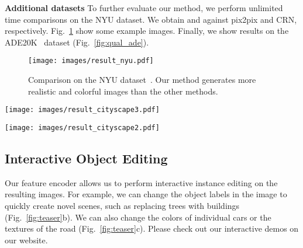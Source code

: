 \documentclass[10pt,twocolumn,letterpaper]{article}
\newcommand{\reffig}[1]{Fig.~\ref{fig:#1}}
\newcommand{\lblfig}[1]{\label{fig:#1}}
\newcommand{\lblsec}[1]{\label{sec:#1}}
\newcommand{\pp}{pix2pix\xspace}
\begin{document}
{\noindent \bf Additional datasets } To further evaluate our method, we perform unlimited time comparisons on the NYU dataset. We obtain  and  against \pp and CRN, respectively. \reffig{qual_nyu} show some example images. 
Finally, we show results on the ADE20K~\cite{zhou2017scene} dataset (\reffig{qual_ade}).

\begin{figure}
  \vspace{-.2in}
  \centering
  \texttt{[image: images/result\_nyu.pdf]}  
  \caption{Comparison on the NYU dataset~\cite{Silberman2012indoor}. Our method generates more realistic and colorful images than the other methods.}
  \lblfig{qual_nyu}
  \vspace{-.1in}
\end{figure}

\begin{figure*}
  \vspace{-.3in}
  \raggedleft
  \texttt{[image: images/result\_cityscape3.pdf]}  
  \vspace{-.1in}
  \caption{Comparison on the Cityscapes dataset~\cite{Cordts2016cityscapes} (label maps shown at the lower left corner in (a)). For both without and with VGG loss, our results are more realistic than the other two methods. Please zoom in for details.}
  \lblfig{qual_cityscape_both}
\end{figure*}

\begin{figure*}
  \vspace{-.1in}
  \raggedleft
  \texttt{[image: images/result\_cityscape2.pdf]}  
  \vspace{-.1in}
  \caption{Additional comparison results with CRN~\cite{chen2017photographic} on the Cityscapes dataset. Again, both our results have finer details in the synthesized cars, the trees, the buildings, etc. Please zoom in for details.}
  \lblfig{qual_cityscape}
  \vspace{-.15in}
\end{figure*}

\subsection{Interactive Object Editing} \lblsec{results:ui}
Our feature encoder allows us to perform interactive instance editing on the resulting images.
For example, we can change the object labels in the image to quickly create novel scenes, such as replacing trees with buildings (\reffig{teaser}b).
We can also change the colors of individual cars or the textures of the road (\reffig{teaser}c).
Please check out our interactive demos on our website.
\end{document}
